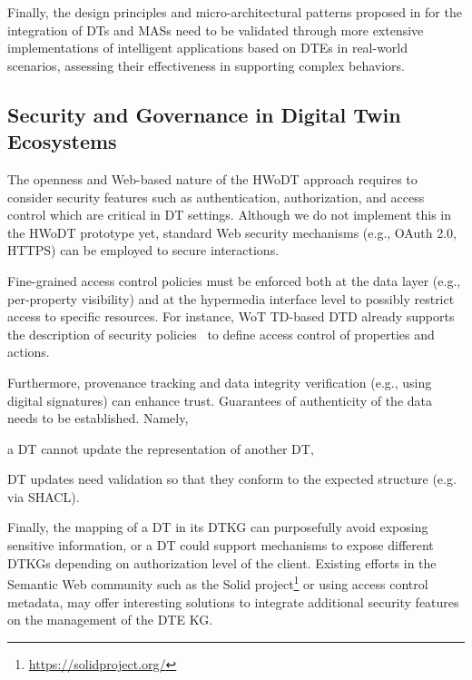 Finally, the design principles and micro-architectural patterns proposed in  for the integration of \acp{DT} and \acp{MAS} need to be validated through more extensive implementations of intelligent applications based on \acp{DTE} in real-world scenarios, assessing their effectiveness in supporting complex behaviors.

\subsection*{Security and Governance in Digital Twin Ecosystems}

The openness and Web-based nature of the \ac{HWoDT} approach requires to consider security features such as authentication, authorization, and access control which are critical in \ac{DT} settings.
Although we do not implement this in the \ac{HWoDT} prototype yet, standard Web security mechanisms (e.g., OAuth 2.0, HTTPS) can be employed to secure interactions.

Fine-grained access control policies must be enforced both at the data layer (e.g., per-property visibility) and at the hypermedia interface level to possibly restrict access to specific resources.
For instance, \ac{WoT} \ac{TD}-based \ac{DTD} already supports the description of security policies~\cite{wot-td} to define access control of properties and actions. 

Furthermore, provenance tracking and data integrity verification (e.g., using digital signatures) can enhance trust.
%
Guarantees of authenticity of the data needs to be established. Namely, 
\begin{inlinelist}
    \item a \ac{DT} cannot update the representation of another \ac{DT},
    \item \ac{DT} updates need validation so that they conform to the expected structure (e.g. via SHACL).
\end{inlinelist}

Finally, the mapping of a \ac{DT} in its \ac{DTKG} can purposefully avoid exposing sensitive information, or a \ac{DT} could support mechanisms to expose different \acp{DTKG} depending on authorization level of the client.
Existing efforts in the Semantic Web community such as the Solid project\footnote{\url{https://solidproject.org/}} or using access control metadata, may offer interesting solutions to integrate additional security features on the management of the \ac{DTE} \ac{KG}. 


